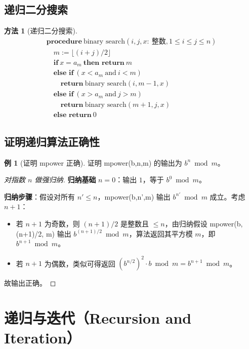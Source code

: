 \documentclass[UTF8,11pt,a4paper]{ctexbook}   %
\theoremstyle{definition}
\newtheorem{example}{例}[section]
\newtheorem{method}{方法}[section]
\begin{document}
\subsection{递归二分搜索}

\begin{method}[递归二分搜索]
\[
\begin{array}{l}
\textbf{procedure}\ \text{binary search}(i,j,x:\ \text{整数}, 1 \leq i \leq j \leq n)\\
\quad m := \lfloor (i+j)/2 \rfloor\\
\quad \textbf{if}\ x = a_m\ \textbf{then return}\ m\\
\quad \textbf{else if}\ (x < a_m\ \text{and}\ i < m)\\
\quad \quad \textbf{return}\ \text{binary search}(i, m-1, x)\\
\quad \textbf{else if}\ (x > a_m\ \text{and}\ j > m)\\
\quad \quad \textbf{return}\ \text{binary search}(m+1, j, x)\\
\quad \textbf{else return}\ 0
\end{array}
\]
\end{method}

\subsection{证明递归算法正确性}

\begin{example}[证明 mpower 正确]
证明 mpower(b,n,m) 的输出为 $b^n \bmod m$。
\end{example}

\begin{proof}[对指数 $n$ 做强归纳]
\textbf{归纳基础} $n=0$：输出 $1$，等于 $b^0 \bmod m$。

\textbf{归纳步骤}：假设对所有 $n' \leq n$，mpower(b,n',m) 输出 $b^{n'} \bmod m$ 成立。考虑 $n+1$：
\begin{itemize}
    \item 若 $n+1$ 为奇数，则 $(n+1)/2$ 是整数且 $\leq n$，由归纳假设 mpower(b, (n+1)/2, m) 输出 $b^{(n+1)/2} \bmod m$，算法返回其平方模 $m$，即 $b^{n+1} \bmod m$。
    \item 若 $n+1$ 为偶数，类似可得返回 $(b^{n/2})^2 \cdot b \bmod m = b^{n+1} \bmod m$。
\end{itemize}
故输出正确。
\end{proof}

\section{递归与迭代（Recursion and Iteration）}
\end{document}
